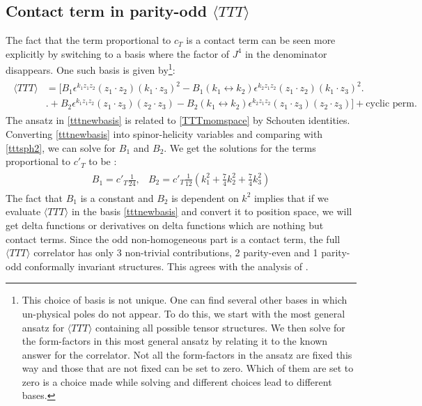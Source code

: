 \documentclass[a4paper,11pt]{article}
\begin{document}
\subsection*{Contact term in parity-odd $\langle TTT \rangle$} 
The fact that the term proportional to $c_T$ is a contact term can be seen more explicitly by switching to a basis where the factor of $J^4$ in the denominator disappears.
One such basis is given by\footnote{This choice of basis is not unique. One can find several other bases in which un-physical poles do not appear. To do this, we start with the most general ansatz for $\langle TTT \rangle$ containing all possible tensor structures. We then solve for the form-factors in this most general ansatz by relating it to the known answer for the correlator. Not all the form-factors in the ansatz are fixed this way and those that are not fixed can be set to zero. Which of them are set to zero is a choice made while solving and different choices lead to different bases.}:
\begin{align}\label{tttnewbasis}
\begin{split}
\langle TTT \rangle &= \bigg[B_1 \epsilon^{k_1 z_1 z_2} (z_1 \cdot z_2) (k_1 \cdot z_3)^2 - B_1 (k_1 \leftrightarrow k_2)\epsilon^{k_2 z_1 z_2} (z_1 \cdot z_2) (k_1 \cdot z_3)^2\bigg.\\[5 pt]
&\bigg.+B_2 \epsilon^{k_1 z_1 z_2} (z_1 \cdot z_3) (z_2 \cdot z_3)-B_2(k_1 \leftrightarrow k_2)\epsilon^{k_2 z_1 z_2} (z_1 \cdot z_3) (z_2 \cdot z_3)\bigg] + \text{cyclic perm.}
\end{split}
\end{align}
The ansatz in \eqref{tttnewbasis} is related to \eqref{TTTmomspace} by Schouten identities. Converting \eqref{tttnewbasis} into spinor-helicity variables and comparing with \eqref{tttsph2}, we can solve for $B_1$ and $B_2$. We get the solutions for the terms proportional to $c'_T$ to be :
\begin{align}
\begin{split}
B_1=c'_T \frac{1}{24},
\end{split}
\begin{split}
B_2 = c'_T \frac{1}{12}\left(k_1^2 + \frac{7}{4} k_2^2+ \frac{7}{4} k_3^2\right)
\end{split}
\end{align}
The fact that $B_1$ is a constant and $B_2$ is dependent on $k^2$ implies that if we evaluate $\langle TTT \rangle$ in the basis \eqref{tttnewbasis} and convert it to position space, we will get delta functions or derivatives on delta functions which are nothing but contact terms.
Since the odd non-homogeneous part is a contact term, the full $\langle TTT \rangle$ correlator has only 3 non-trivial contributions, 2 parity-even and 1  parity-odd conformally invariant structures. This agrees with the analysis of \cite{Maldacena:2011jn}. 
\end{document}
